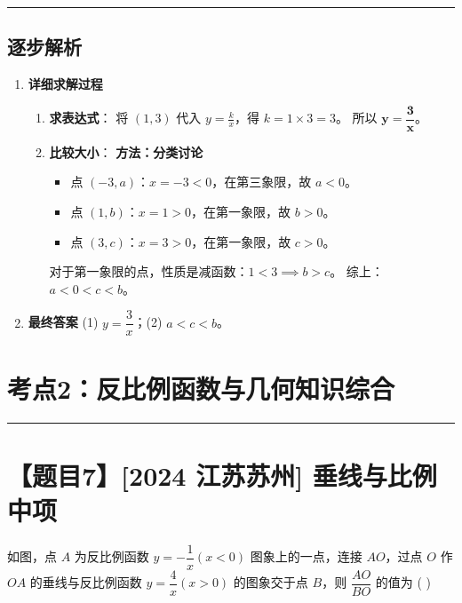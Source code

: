 \documentclass[UTF8]{ctexart}
\newenvironment{redenv}{\color{red}}{}
\newenvironment{detailedanalysis}{%
    \color{red}
    \begin{enumerate}[label=\textbf{第\arabic*步：}, leftmargin=*, align=left, itemsep=1.5ex]
}{%
    \end{enumerate}
}
\newcommand{\problemrule}{\noindent\rule{\textwidth}{1.5pt}\vspace{-0.8em}}
\newcommand{\analysisrule}{\noindent\rule{\textwidth}{0.8pt}\vspace{-0.8em}}
\begin{document}
\begin{redenv}
\analysisrule
\subsection*{逐步解析}

\begin{detailedanalysis}
\item \textbf{详细求解过程}
\begin{enumerate}[label=(\arabic*)]
    \item \textbf{求表达式}：
    将 $(1,3)$ 代入 $y=\frac{k}{x}$，得 $k = 1 \times 3 = 3$。
    所以 $\boldsymbol{y = \dfrac{3}{x}}$。

    \item \textbf{比较大小}：
    \textbf{方法：分类讨论}
    \begin{itemize}
        \item 点 $(-3, a)$：$x=-3 < 0$，在第三象限，故 $a < 0$。
        \item 点 $(1, b)$：$x=1 > 0$，在第一象限，故 $b > 0$。
        \item 点 $(3, c)$：$x=3 > 0$，在第一象限，故 $c > 0$。
    \end{itemize}
    对于第一象限的点，性质是减函数：$1 < 3 \implies b > c$。
    综上：$a < 0 < c < b$。
\end{enumerate}

\item \textbf{最终答案}
(1) $y = \dfrac{3}{x}$；(2) $a < c < b$。
\end{detailedanalysis}
\end{redenv}

\section*{考点2：反比例函数与几何知识综合}

\problemrule
\section*{【题目7】[2024 江苏苏州] 垂线与比例中项}
如图，点 $A$ 为反比例函数 $y=-\dfrac{1}{x} (x<0)$ 图象上的一点，连接 $AO$，过点 $O$ 作 $OA$ 的垂线与反比例函数 $y=\dfrac{4}{x} (x>0)$ 的图象交于点 $B$，则 $\dfrac{AO}{BO}$ 的值为 ( \quad )
\end{document}
